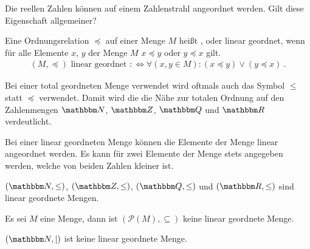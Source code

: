 \begin{Unit}
Die reellen Zahlen können auf einem Zahlenstrahl angeordnet werden. Gilt diese
Eigenschaft allgemeiner?

\begin{Definition}
  Eine Ordnungsrelation $\preceq$ auf einer Menge $M$ heißt ,  oder \Begriff
  {linear geordnet}, wenn für alle Elemente $x$, $y$ 
  der Menge $M$ $x \preceq y$ oder $y \preceq x$ gilt.
  \begin{align}
    (M, \preceq) \text{ linear geordnet } :\Leftrightarrow \forall 
    (x, y \in M): (x \preceq y) \lor (y \preceq x) \ .
  \end{align}
\end{Definition}

Bei einer total geordneten Menge verwendet wird oftmals auch das Symbol 
$\leq$ statt $\preceq$ verwendet. Damit wird die die Nähe zur totalen
Ordnung auf den Zahlenmengen $\NN$, $\ZZ$, $\QQ$ und $\RR$ verdeutlicht.

Bei einer linear geordneten Menge können die Elemente der Menge linear
angeordnet werden. Es kann für zwei Elemente der Menge stets angegeben werden, 
welche von beiden Zahlen kleiner ist.
\end{Unit}

\begin{Unit}[Beispiel] 
  $(\NN, \leq)$, $(\ZZ, \leq)$, $(\QQ, \leq)$ und $(\RR, \leq)$ sind linear 
  geordnete Mengen.
\end{Unit}

\begin{Unit}[Beispiel] 
  Es sei $M$ eine Menge, dann ist $(\mathcal{P}(M), \subseteq)$ keine linear 
  geordnete Menge.
\end{Unit}

\begin{Unit}[Beispiel] 
  $(\NN, |)$ ist keine linear geordnete Menge.
\end{Unit}

